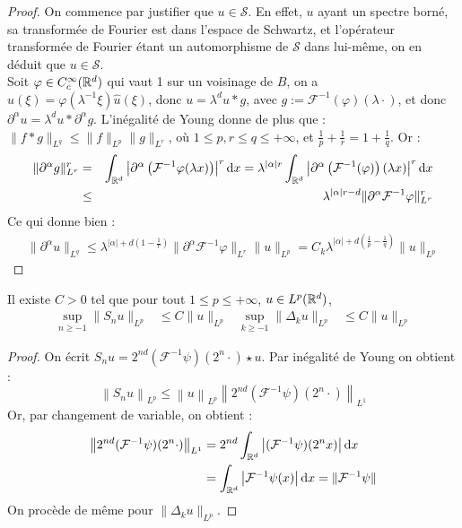 \documentclass[11pt,a4paper]{article}
\begin{document}
\begin{proof}
On commence par justifier que $u\in \mathcal{S}$. En effet, $u$ ayant un spectre borné, sa transformée de Fourier est dans l'espace de Schwartz, et l'opérateur transformée de Fourier étant un automorphisme de $\mathcal{S}$ dans lui-même, on en déduit que $u\in \mathcal{S}$. \\
Soit $\varphi \in C^\infty_c(\mathbb R^d)$ qui vaut 1 sur un voisinage de $B$, on a $\hat{u}(\xi)=\varphi(\lambda^{-1}\xi)\hat{u}(\xi)$, donc $u=\lambda^d u * g$, avec $g := \mathcal{F}^{-1}(\varphi)(\lambda \cdot)$, et donc $\partial^\alpha u =\lambda^d u * \partial^\alpha g$. L'inégalité de Young donne de plus que : $\|f * g \|_{L^q} \leq \|f\|_{L^p} \|g\|_{L^r}$, où $1\leq p,r\leq q \leq +\infty$, et $\frac{1}{p}+\frac{1}{r}= 1 + \frac{1}{q}$. Or :
\begin{eqnarray*}
\| \partial^\alpha g \|^r_{L^r} &=& \int_{\mathbb R^d} \left | \partial^\alpha \left(\mathcal{F}^{-1} \varphi(\lambda x)\right) \right |^r \mathrm{d}x =   \lambda^{|\alpha|r} \int_{\mathbb R^d} \left | \partial^\alpha \left(\mathcal{F}^{-1}(\varphi)\right)(\lambda x) \right |^r \mathrm{d}x  \\
&\leq& \lambda^{|\alpha|r-d} \| \partial^\alpha \mathcal{F}^{-1}\varphi \|^r_{L^r}
\end{eqnarray*}
Ce qui donne bien :
\begin{eqnarray*}
\| \partial^\alpha u \|_{L^q} \leq \lambda^{|\alpha| + d(1-\frac{1}{r})} \| \partial^\alpha \mathcal{F}^{-1}\varphi \|_{L^r} \|u\|_{L^p} = C_k\lambda^{|\alpha| + d(\frac{1}{p}-\frac{1}{q})} \|u\|_{L^p}
\end{eqnarray*}
\end{proof}


\begin{lemma}\label{young}
Il existe $C>0$ tel que pour tout $1\leq p \leq +\infty$, $u \in L^p(\mathbb R^d)$, 
\begin{align*}
\sup_{n\geq -1}\|S_nu\|_{L^p} &\leq C \|u\|_{L^p} & \sup_{k\geq -1}\|\Delta_ku\|_{L^p} &\leq C \|u\|_{L^p}
\end{align*}
\end{lemma}

\begin{proof}
On écrit $S_n u = 2^{nd} (\mathcal{F}^{-1}\psi)(2^n\cdot)\star u$. Par inégalité de Young on obtient :
$$\left\lVert S_n u \right\rVert_{L^p} \leq \left\lVert u \right\rVert_{L^p} \left\lVert 2^{nd} (\mathcal{F}^{-1}\psi)(2^n\cdot) \right\rVert_{L^1}$$ 
Or, par changement de variable, on obtient : 
\begin{align*}
 \left\lVert 2^{nd} (\mathcal{F}^{-1}\psi)(2^n\cdot) \right\rVert_{L^1} &= 2^{nd} \int_{\mathbb R^d} \left| (\mathcal{F}^{-1}\psi)(2^nx)  \right| \mathrm{d}x \\
 &= \int_{\mathbb R^d} \left| \mathcal{F}^{-1}\psi(x) \right| \mathrm{d}x = \|\mathcal{F}^{-1}\psi\|
\end{align*}
On procède de même pour $\|\Delta_k u\|_{L^p}$.
\end{proof}
\end{document}

